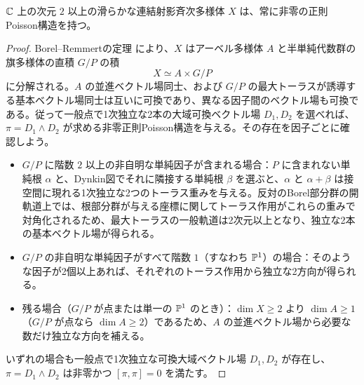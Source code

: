 \begin{theorem}\label{thm:homogeneous-poisson}
$\mathbb C$ 上の次元 $2$ 以上の滑らかな連結射影斉次多様体 $X$ は、常に非零の正則Poisson構造を持つ。
\end{theorem}
\begin{proof}
Borel--Remmertの定理 \cite[Theorem~I]{BorelRemmert} により、$X$ はアーベル多様体 $A$ と半単純代数群の旗多様体の直積 $G/P$ の積
\[
  X\simeq A\times G/P
\]
に分解される。$A$ の並進ベクトル場同士、および $G/P$ の最大トーラスが誘導する基本ベクトル場同士は互いに可換であり、異なる因子間のベクトル場も可換である。従って一般点で1次独立な2本の大域可換ベクトル場 $D_1,D_2$ を選べれば、$\pi=D_1\wedge D_2$ が求める非零正則Poisson構造を与える。その存在を因子ごとに確認しよう。
\begin{itemize}
  \item $G/P$ に階数 $2$ 以上の非自明な単純因子が含まれる場合：$P$ に含まれない単純根 $\alpha$ と、Dynkin図でそれに隣接する単純根 $\beta$ を選ぶと、$\alpha$ と $\alpha+\beta$ は接空間に現れる1次独立な2つのトーラス重みを与える。反対のBorel部分群の開軌道上では、根部分群が与える座標に関してトーラス作用がこれらの重みで対角化されるため、最大トーラスの一般軌道は2次元以上となり、独立な2本の基本ベクトル場が得られる。
  \item $G/P$ の非自明な単純因子がすべて階数 $1$（すなわち $\mathbb P^1$）の場合：そのような因子が2個以上あれば、それぞれのトーラス作用から独立な2方向が得られる。
  \item 残る場合（$G/P$ が点または単一の $\mathbb P^1$ のとき）：$\dim X\ge2$ より $\dim A\ge1$（$G/P$ が点なら $\dim A\ge2$）であるため、$A$ の並進ベクトル場から必要な数だけ独立な方向を補える。
\end{itemize}
いずれの場合も一般点で1次独立な可換大域ベクトル場 $D_1,D_2$ が存在し、$\pi=D_1\wedge D_2$ は非零かつ $[\pi,\pi]=0$ を満たす。
\end{proof}
